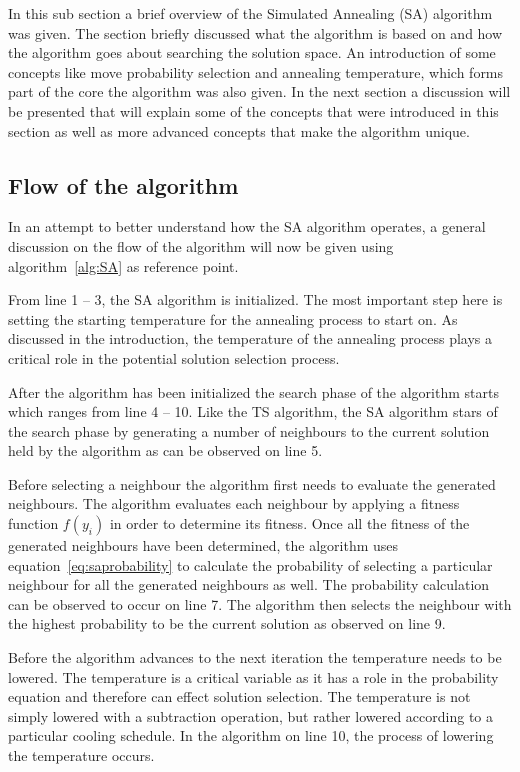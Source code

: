 In this sub section a brief overview of the Simulated Annealing (SA) algorithm was given. The section briefly discussed what the algorithm is based on and how the algorithm goes about searching the solution space. An introduction of some concepts like move probability selection and annealing temperature, which forms part of the core the algorithm was also given. In the next section a discussion will be presented that will explain some of the concepts that were introduced in this section as well as more advanced concepts that make the algorithm unique.

\subsection{Flow of the algorithm}
In an attempt to better understand how the SA algorithm operates, a general discussion on the flow of the algorithm will now be given using algorithm~\ref{alg:SA} as reference point.

From line 1 -- 3, the SA algorithm is initialized. The most important step here is setting the starting temperature for the annealing process to start on. As discussed in the introduction, the temperature of the annealing process plays a critical role in the potential solution selection process.

After the algorithm has been initialized the search phase of the algorithm starts which ranges from line 4 -- 10. Like the TS algorithm, the SA algorithm stars of the search phase by generating a number of neighbours to the current solution held by the algorithm as can be observed on line 5.

Before selecting a neighbour the algorithm first needs to evaluate the generated neighbours. The algorithm evaluates each neighbour by applying a fitness function $f(y_i)$ in order to determine its fitness.
Once all the fitness of the generated neighbours have been determined, the algorithm uses equation~\ref{eq:saprobability} to calculate the probability of selecting a particular neighbour for all the generated neighbours as well. The probability calculation can be observed to occur on line 7. The algorithm then selects the neighbour with the highest probability to be the current solution as observed on line 9. 

Before the algorithm advances to the next iteration the temperature needs to be lowered. The temperature is a critical variable as it has a role in the probability equation and therefore can effect solution selection. The temperature is not simply lowered with a subtraction operation, but rather lowered according to a particular cooling schedule. In the algorithm on line 10, the process of lowering the temperature occurs.


